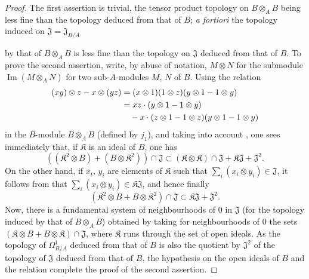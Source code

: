 \begin{proof}
The first assertion is trivial, the tensor product topology on $B\otimes_A B$ being less fine than the topology deduced from that of $B$; \emph{a fortiori} the topology induced on $\mathfrak{J}=\mathfrak{J}_{B/A}$

by that of $B\otimes_A B$ is less fine than the topology on $\mathfrak{J}$ deduced from that of $B$.
To prove the second assertion, write, by abuse of notation, $M\otimes N$ for the submodule $\operatorname{Im}(M\otimes_A N)$ for two sub-$A$-modules $M$, $N$ of $B$.
Using the relation
\[
  \begin{aligned}
  (xy)\otimes z- x\otimes(yz)
  &=(x\otimes 1)(1\otimes z)(y\otimes 1- 1\otimes y)\\
  &=xz\cdot(y\otimes 1- 1\otimes y)\\
  &\quad- x\cdot(z\otimes 1- 1\otimes z)(y\otimes 1- 1\otimes y)
  \end{aligned}
\]
in the $B$-module $B\otimes_A B$ (defined by $j_1$), and taking into account , one sees immediately that, if $\mathfrak{K}$ is an ideal of $B$, one has
\[
  ((\mathfrak{K}^2\otimes B)+(B\otimes\mathfrak{K}^2))\cap\mathfrak{J}
  \subset(\mathfrak{K}\otimes\mathfrak{K})\cap\mathfrak{J}
  +\mathfrak{K}\mathfrak{J}+\mathfrak{J}^2.
\]
On the other hand, if $x_i$, $y_i$ are elements of $\mathfrak{K}$ such that
$\sum_i(x_i\otimes y_i)\in\mathfrak{J}$, it follows from
 that $\sum_i(x_i\otimes y_i)\in\mathfrak{K}\mathfrak{J}$,
and hence finally
\begin{equation}
\tag{20.4.5.1}
  \label{0.20.4.5.1}
  (\mathfrak{K}^2\otimes B+B\otimes\mathfrak{K}^2)\cap\mathfrak{J}\subset\mathfrak{K}\mathfrak{J}+\mathfrak{J}^2.
\end{equation}
Now, there is a fundamental system of neighbourhoods of $0$ in $\mathfrak{J}$ (for the topology induced by that of $B\otimes_A B$) obtained by taking for neighbourhoods of $0$ the sets $(\mathfrak{K}\otimes B+B\otimes\mathfrak{K})\cap\mathfrak{J}$, where $\mathfrak{K}$ runs through the set of open ideals.
As the topology of $\Omega^1_{B/A}$ deduced from that of $B$ is also the quotient by $\mathfrak{J}^2$ of the topology of $\mathfrak{J}$ deduced from that of $B$, the hypothesis on the open ideals of $B$ and the relation  complete the proof of the second assertion.
\end{proof}

